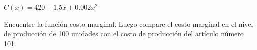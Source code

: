 \setcounter{enumi}{26}
\item $C(x) = 420 + 1.5x + 0.002x^2$
\par
Encuentre la función costo marginal. Luego compare el costo marginal en el nivel de producción de 100 unidades con el costo de producción del artículo número 101.
